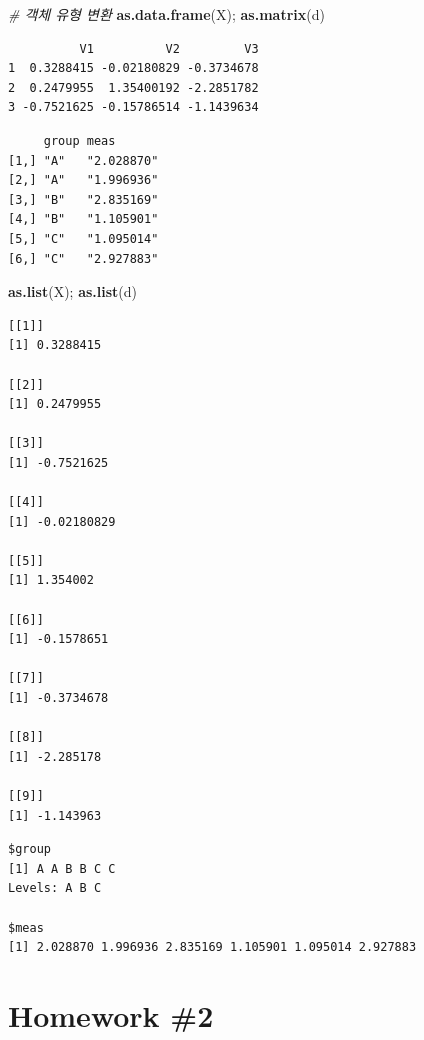 \documentclass[
  11pt,
]{krantz}
\newenvironment{Shaded}{\begin{snugshade}}{\end{snugshade}}
\newcommand{\CommentTok}[1]{\textcolor[rgb]{0.37,0.37,0.37}{\textit{#1}}}
\newcommand{\KeywordTok}[1]{\textcolor[rgb]{0.27,0.27,0.27}{\textbf{#1}}}
\newcommand{\NormalTok}[1]{#1}
\begin{document}
\begin{Shaded}
\begin{Highlighting}[]
\CommentTok{# 객체 유형 변환}
\KeywordTok{as.data.frame}\NormalTok{(X); }\KeywordTok{as.matrix}\NormalTok{(d)}
\end{Highlighting}
\end{Shaded}

\begin{verbatim}
          V1          V2         V3
1  0.3288415 -0.02180829 -0.3734678
2  0.2479955  1.35400192 -2.2851782
3 -0.7521625 -0.15786514 -1.1439634
\end{verbatim}

\begin{verbatim}
     group meas      
[1,] "A"   "2.028870"
[2,] "A"   "1.996936"
[3,] "B"   "2.835169"
[4,] "B"   "1.105901"
[5,] "C"   "1.095014"
[6,] "C"   "2.927883"
\end{verbatim}

\begin{Shaded}
\begin{Highlighting}[]
\KeywordTok{as.list}\NormalTok{(X); }\KeywordTok{as.list}\NormalTok{(d)}
\end{Highlighting}
\end{Shaded}

\begin{verbatim}
[[1]]
[1] 0.3288415

[[2]]
[1] 0.2479955

[[3]]
[1] -0.7521625

[[4]]
[1] -0.02180829

[[5]]
[1] 1.354002

[[6]]
[1] -0.1578651

[[7]]
[1] -0.3734678

[[8]]
[1] -2.285178

[[9]]
[1] -1.143963
\end{verbatim}

\begin{verbatim}
$group
[1] A A B B C C
Levels: A B C

$meas
[1] 2.028870 1.996936 2.835169 1.105901 1.095014 2.927883
\end{verbatim}

\normalsize

\hypertarget{homework-2}{%
\section{Homework \#2}\label{homework-2}}
\end{document}
